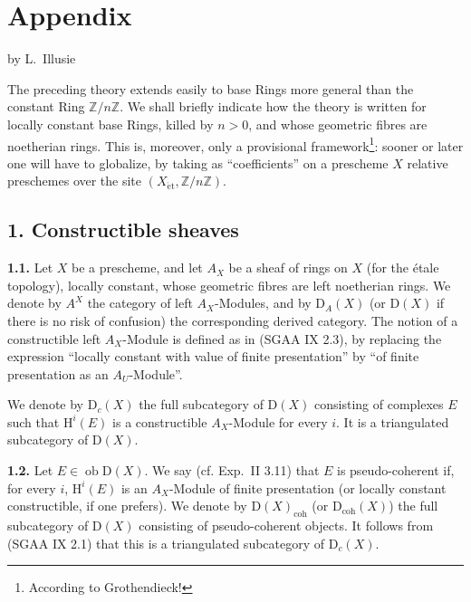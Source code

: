 \documentclass[11pt]{article}
\renewcommand{\H}{\mathrm{H}}
\newcommand{\D}{\mathrm{D}}
\newcommand{\Z}{\mathbb{Z}}
\newcommand{\ob}{\operatorname{ob}}
\begin{document}
\section*{Appendix}
\begin{center}
by L.~Illusie
\end{center}

The preceding theory extends easily to base Rings more general than the constant Ring $\Z/n\Z$. We shall briefly indicate how the theory is written for locally constant base Rings, killed by $n>0$, and whose geometric fibres are noetherian rings. This is, moreover, only a provisional framework\footnote{According to Grothendieck!}: sooner or later one will have to globalize, by taking as ``coefficients'' on a prescheme $X$ relative preschemes over the site $(X_{\mathrm{\acute et}},\Z/n\Z)$.

\subsection*{1. Constructible sheaves}

\textbf{1.1.} Let $X$ be a prescheme, and let $A_X$ be a sheaf of rings on $X$ (for the étale topology), locally constant, whose geometric fibres are left noetherian rings. We denote by $A^{X}$ the category of left $A_X$-Modules, and by $\D_A(X)$ (or $\D(X)$ if there is no risk of confusion) the corresponding derived category. The notion of a constructible left $A_X$-Module is defined as in (SGAA IX 2.3), by replacing the expression ``locally constant with value of finite presentation'' by ``of finite presentation as an $A_U$-Module''.

We denote by $\D_c(X)$ the full subcategory of $\D(X)$ consisting of complexes $E$ such that $\H^i(E)$ is a constructible $A_X$-Module for every $i$. It is a triangulated subcategory of $\D(X)$.

\textbf{1.2.} Let $E\in\ob\D(X)$. We say (cf. Exp.~II 3.11) that $E$ is pseudo-coherent if, for every $i$, $\H^i(E)$ is an $A_X$-Module of finite presentation (or locally constant constructible, if one prefers). We denote by $\D(X)_{\mathrm{coh}}$ (or $\D_{\mathrm{coh}}(X)$) the full subcategory of $\D(X)$ consisting of pseudo-coherent objects. It follows from (SGAA IX 2.1) that this is a triangulated subcategory of $\D_c(X)$.
\end{document}
